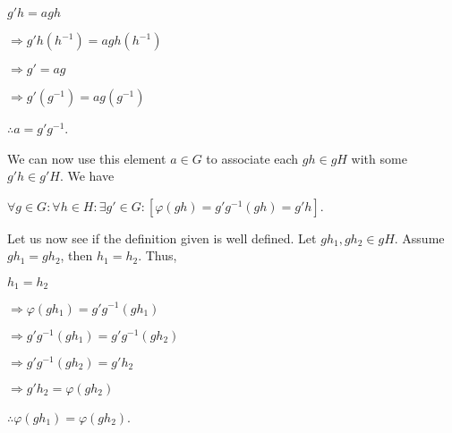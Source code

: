 \documentclass[12pt, a4paper]{article}
\begin{document}
\newpage

\hspace{2mm} $g'h=agh$\par
\vspace{2mm}
\hspace{10mm} $\Rightarrow g'h(h^{-1})=agh(h^{-1})$\par
\vspace{2mm}
\hspace{10mm} $\Rightarrow g'=ag$\par
\vspace{2mm}
\hspace{10mm} $\Rightarrow g'(g^{-1})=ag(g^{-1})$\par
\vspace{2mm}
\hspace{2mm} $\therefore a=g'g^{-1}$.\par
\vspace{4mm}

    We can now use this element $a\in G$ to associate each $gh\in gH$ with some $g'h\in g'H$. We have\par
    
\vspace{4mm}

        \centerline{$\forall g\in G\colon\forall h\in H\colon\exists g'\in G\colon[\varphi(gh)=g'g^{-1}(gh)=g'h]$.}
        
\vspace{4mm}

    Let us now see if the definition given is well defined. Let $gh_1,gh_2\in gH$. Assume $gh_1=gh_2$, then $h_1=h_2$. Thus,\par
    
\vspace{4mm}

\hspace{2mm} $h_1=h_2$\par
\vspace{2mm}
\hspace{10mm} $\Rightarrow\varphi(gh_1)=g'g^{-1}(gh_1)$\par
\vspace{2mm}
\hspace{10mm} $\Rightarrow g'g^{-1}(gh_1)=g'g^{-1}(gh_2)$\par
\vspace{2mm}
\hspace{10mm} $\Rightarrow g'g^{-1}(gh_2)=g'h_2$\par
\vspace{2mm}
\hspace{10mm} $\Rightarrow g'h_2=\varphi(gh_2)$\par
\vspace{2mm}
\hspace{2mm} $\therefore\varphi(gh_1)=\varphi(gh_2)$.\par
\end{document}
